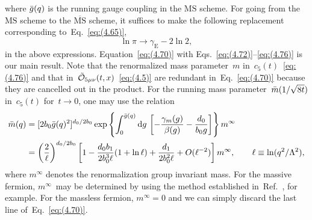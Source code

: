 where $\Bar{g}(q)$ is the running gauge coupling in the $\text{MS}$ scheme.
For going from the $\text{MS}$ scheme to the $\overline{\text{MS}}$ scheme, it
suffices to make the following replacement corresponding
to~Eq.~\eqref{eq:(4.65)}, 
\begin{equation}
   \ln\pi\to\gamma_{\mathrm{E}}-2\ln2,
\label{eq:(4.77)}
\end{equation}
in the above expressions. Equation~\eqref{eq:(4.70)} with
Eqs.~\eqref{eq:(4.72)}--\eqref{eq:(4.76)} is our main result. Note that the
renormalized mass parameter~$m$ in~$c_5(t)$~\eqref{eq:(4.76)} and that
in~$\Tilde{\mathcal{O}}_{5\mu\nu}(t,x)$~\eqref{eq:(4.5)} are redundant
in~Eq.~\eqref{eq:(4.70)} because they are cancelled out in the product. For the
running mass parameter~$\Bar{m}(1/\sqrt{8t})$ in~$c_5(t)$ for~$t\to0$, one may
use the relation
\begin{align}
   \Bar{m}(q)&=[2b_0\Bar{g}(q)^2]^{d_0/2b_0}
   \exp\left\{\int_0^{\Bar{g}(q)}\mathrm{d}g\,
   \left[-\frac{\gamma_m(g)}{\beta(g)}-\frac{d_0}{b_0g}\right]\right\}m^\infty
\notag\\
   &=\left(\frac{2}{\ell}\right)^{d_0/2b_0}
   \left[1-\frac{d_0b_1}{2b_0^3\ell}(1+\ln\ell)+\frac{d_1}{2b_0^2\ell}
   +O(\ell^{-2})\right]m^\infty,\qquad\ell\equiv\ln(q^2/\Lambda^2),
\label{eq:(4.78)}
\end{align}
where $m^\infty$ denotes the renormalization group invariant mass. For the
massive fermion, $m^\infty$~may be determined by using the method established
in~Ref.~\cite{Capitani:1998mq}, for example. For the massless fermion,
$m^\infty=0$ and we can simply discard the last line of~Eq.~\eqref{eq:(4.70)}.
